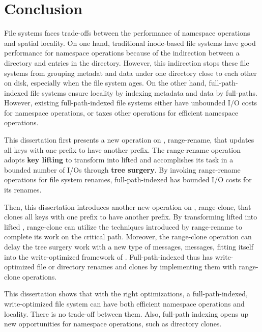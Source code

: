 \chapter{Conclusion}
\label{chap:conclusion}

File systems faces trade-offs between the performance of namespace
operations and spatial locality.
On one hand,
traditional inode-based file systems have good performance for namespace
operations because of the indirection between a directory and entries in the
directory.
However, this indirection stops these file systems from grouping metadat and data
under one directory close to each other on disk,
especially when the file system ages.
On the other hand, full-path-indexed file systems ensure locality by indexing
metadata and data by full-paths.
However, existing full-path-indexed file systems either have unbounded I/O costs for
namespace operations, or taxes other operations for efficient namespace operations.

This dissertation first presents a new operation on \bets, range-rename,
that updates all keys with one prefix to have another prefix.
The range-rename operation adopts \textbf{key lifting} to transform \bets into
lifted \bets
and accomplishes its task in a bounded number of I/Os through
\textbf{tree surgery}.
By invoking range-rename operations for file system renames,
full-path-indexed \betrfs has bounded I/O costs for its renames.

Then, this dissertation introduces another new operation on \bets, range-clone,
that clones all keys with one prefix to have another prefix.
By transforming lifted \bets into lifted \bedags, range-clone can utilize
the techniques introduced by range-rename to complete its work on the critical path.
Moreover, the range-clone operation can delay the tree surgery work with a new
type of messages, \goto messages, fitting itself into the write-optimized
framework of \bedags.
Full-path-indexed \betrfs thus has write-optimized file or directory renames and
clones by implementing them with range-clone operations.

This dissertation shows that with the right optimizations, a full-path-indexed,
write-optimized file system can
have both efficient namespace operations and locality.
There is no trade-off between them.
Also, full-path indexing opens up new opportunities for namespace operations,
such as directory clones.

